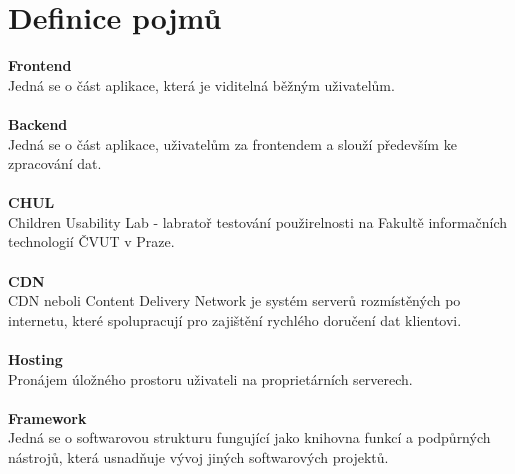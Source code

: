 \documentclass[thesis=M,czech]{FITthesis}[2012/06/26]
\begin{document}
\section{Definice pojmů} \label{sec:analyza_definice_pojmu}
\textbf{Frontend}\\
Jedná se o část aplikace, která je viditelná běžným uživatelům.\\ \\
\textbf{Backend}\\
Jedná se o část aplikace, uživatelům  za frontendem a slouží především ke zpracování dat.\\ \\
\textbf{CHUL}\\
Children Usability Lab - labratoř testování použirelnosti na Fakultě informačních technologií ČVUT v Praze.\\ \\
\textbf{CDN}\\
CDN neboli Content Delivery Network je systém serverů rozmístěných po internetu, které spolupracují pro zajištění rychlého doručení dat klientovi.\\ \\
\textbf{Hosting}\\
Pronájem úložného prostoru uživateli na proprietárních serverech.\\ \\
\textbf{Framework}\\
Jedná se o softwarovou strukturu fungující jako knihovna funkcí a podpůrných nástrojů, která usnadňuje vývoj jiných softwarových projektů.\\ \\
\end{document}
